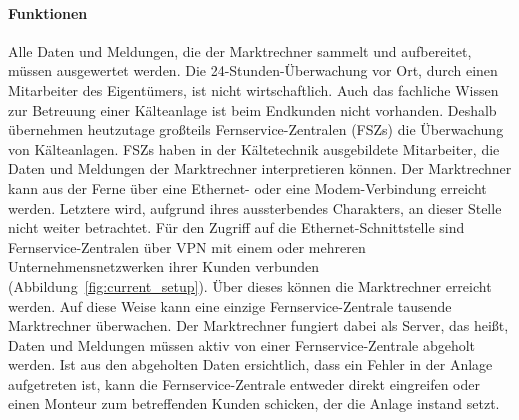 \documentclass[11pt,a4paper]{report}
\begin{document}
\paragraph{Funktionen} \label{para:architektur}

Alle Daten und Meldungen, die der Marktrechner sammelt und aufbereitet, müssen ausgewertet werden. Die 24-Stunden-Überwachung vor Ort, durch einen Mitarbeiter des Eigentümers, ist nicht wirtschaftlich. Auch das fachliche Wissen zur Betreuung einer Kälteanlage ist beim Endkunden nicht vorhanden. Deshalb übernehmen heutzutage großteils Fernservice-Zentralen (FSZs) die Überwachung von Kälteanlagen. FSZs haben in der Kältetechnik ausgebildete Mitarbeiter, die Daten und Meldungen der Marktrechner interpretieren können. Der Marktrechner kann aus der Ferne über eine Ethernet- oder eine Modem-Verbindung erreicht werden. Letztere wird, aufgrund ihres aussterbendes Charakters, an dieser Stelle nicht weiter betrachtet. Für den Zugriff auf die Ethernet-Schnittstelle sind Fernservice-Zentralen über VPN mit einem oder mehreren Unternehmensnetzwerken ihrer Kunden verbunden (Abbildung~\ref{fig:current_setup}). Über dieses können die Marktrechner erreicht werden. Auf diese Weise kann eine einzige Fernservice-Zentrale tausende Marktrechner überwachen. Der Marktrechner fungiert dabei als Server, das heißt, Daten und Meldungen müssen aktiv von einer Fernservice-Zentrale abgeholt werden. Ist aus den abgeholten Daten ersichtlich, dass ein Fehler in der Anlage aufgetreten ist, kann die Fernservice-Zentrale entweder direkt eingreifen oder einen Monteur zum betreffenden Kunden schicken, der die Anlage instand setzt.

\end{document}
